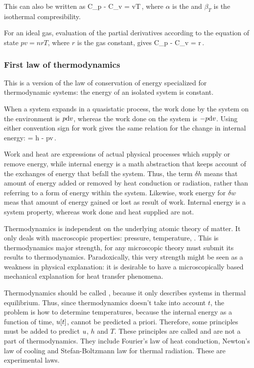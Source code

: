 This can also be written as
\beq
C_p - C_v = vT\,,
\eeq
where $\alpha$ is the  and $\beta_T$ is the isothermal compresibility.

For an ideal gas, evaluation of the partial derivatives according to the equation of state $pv = nrT$, where $r$ is the gas constant, gives
\beq
C_p - C_v = r\,.
\eeq


\subsubsection{First law of thermodynamics}
This is a version of the law of conservation of energy specialized for thermodynamic systems: the energy of an isolated system is constant.

When a system expands in a quasistatic process, the work done by the system on the environment is $p\text{d} v$, whereas the work done on the system is $-p\text{d} v$. Using either convention sign for work gives the same relation for the change in internal energy:
\beq
\dx\ien = \delta h - p\dx v\,.
\eeq

Work and heat are expressions of actual physical processes which supply or remove energy, while internal energy is a math abstraction that keeps account of the exchanges of energy that befall the system. Thus, the term $\delta h$ means that amount of energy added or removed by heat conduction or radiation, rather than referring to a form of energy within the system. Likewise, work energy for $\delta w$ meas that amount of energy gained or lost as result of work. Internal energy is a system property, whereas work done and heat supplied are not.

\begin{note}
Thermodynamics is independent on the underlying atomic theory of matter. It only deals with macroscopic properties: pressure, temperature, \etc. This is thermodynamics major strength, for any microscopic theory must submit its results to thermodynamics. Paradoxically, this very strength might be seen as a weakness in physical explanation: it is desirable to have a microscopically based mechanical explanation for heat transfer phenomena.
\end{note}

\begin{note}
Thermodynamics should be called , because it only describes systems in thermal equilibrium. Thus, since thermodynamics doesn't take into account $t$, the problem is how to determine temperatures, because the internal energy as a function of time, $u\!\left[{t}\right]$, cannot be predicted a priori. Therefore, some principles must be added to predict $u$, $h$ and $T$. These principles are called  and are not a part of thermodynamics. They include Fourier's law of heat conduction, Newton's law of cooling and Stefan-Boltzmann law for thermal radiation. These are experimental laws. 
\end{note}


